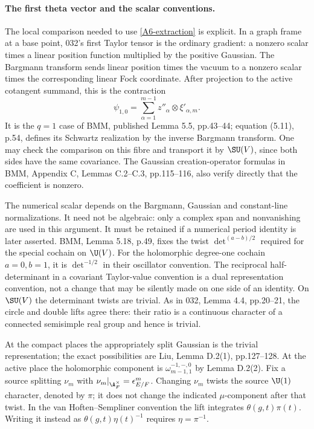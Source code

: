 \paragraph{The first theta vector and the scalar conventions.}
The local comparison needed to use \eqref{A6-extraction} is explicit.
In a graph frame at a base point, 032's first Taylor tensor is the
ordinary gradient: a nonzero scalar times a linear position function
multiplied by the positive Gaussian. The Bargmann transform sends
linear position times the vacuum to a nonzero scalar times the
corresponding linear Fock coordinate. After projection to the active
cotangent summand, this is the contraction
\[
 \psi_{1,0}=\sum_{\alpha=1}^{m-1}
                 z''_\alpha\otimes\xi'_{\alpha,m}.
\]
It is the $q=1$ case of BMM, published Lemma 5.5, pp.43--44;
equation (5.11), p.54, defines its Schwartz realization by the
inverse Bargmann transform. One may check the comparison on this
fibre and transport it by $\SU(V)$, since both sides have the same
covariance. The Gaussian creation-operator formulas in BMM,
Appendix C, Lemmas C.2--C.3, pp.115--116, also verify directly that
the coefficient is nonzero.

The numerical scalar depends on the Bargmann, Gaussian and
constant-line normalizations. It need not be algebraic: only a
complex span and nonvanishing are used in this argument. It must be
retained if a numerical period identity is later asserted.
BMM, Lemma 5.18, p.49, fixes the twist
$\det^{(a-b)/2}$ required for the special cochain on $\U(V)$.
For the holomorphic degree-one cochain $a=0,b=1$, it is
$\det^{-1/2}$ in their oscillator convention. The reciprocal
half-determinant in a covariant Taylor-value convention is a dual
representation convention, not a change that may be silently made
on one side of an identity. On $\SU(V)$ the determinant twists
are trivial. As in 032, Lemma 4.4, pp.20--21, the circle and double
lifts agree there: their ratio is a continuous character of a
connected semisimple real group and hence is trivial.

At the compact places the appropriately split Gaussian is the
trivial representation; the exact possibilities are Liu,
Lemma D.2(1), pp.127--128. At the active place the holomorphic
component is $\omega_{m-1,1}^{-1,-,0}$ by Lemma D.2(2).
Fix a source splitting $\nu_m$ with
$\nu_m|_{\A_F^\times}=\epsilon_{E/F}^m$. Changing $\nu_m$
twists the source $\U(1)$ character, denoted by $\pi$; it does not
change the indicated $\mu$-component after that twist. In the
van Hoften--Sempliner convention the lift integrates
$\theta(g,t)\pi(t)$. Writing it instead as
$\theta(g,t)\eta(t)^{-1}$ requires $\eta=\pi^{-1}$.

